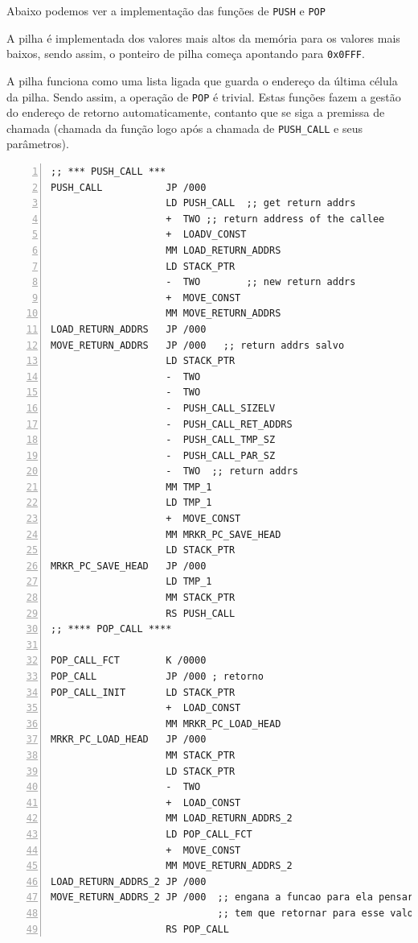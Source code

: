 Abaixo podemos ver a implementação das funções de \verb!PUSH! e \verb!POP!

A pilha é implementada dos valores mais altos da memória para os valores mais
baixos, sendo assim, o ponteiro de pilha começa apontando para \verb!0x0FFF!.

A pilha funciona como uma lista ligada que guarda o endereço da última célula
da pilha. Sendo assim, a operação de \verb!POP! é trivial. Estas funções fazem
a gestão do endereço de retorno automaticamente, contanto que se siga a
premissa de chamada (chamada da função logo após a chamada de \verb!PUSH_CALL!
e seus parâmetros).

\begin{lstlisting}[basicstyle=\footnotesize,numbers=left,breaklines=true,morekeywords={}]
;; *** PUSH_CALL ***
PUSH_CALL           JP /000 
                    LD PUSH_CALL  ;; get return addrs 
                    +  TWO ;; return address of the callee
                    +  LOADV_CONST
                    MM LOAD_RETURN_ADDRS 
                    LD STACK_PTR
                    -  TWO        ;; new return addrs  
                    +  MOVE_CONST 
                    MM MOVE_RETURN_ADDRS 
LOAD_RETURN_ADDRS   JP /000  
MOVE_RETURN_ADDRS   JP /000   ;; return addrs salvo 
                    LD STACK_PTR          
                    -  TWO 
                    -  TWO 
                    -  PUSH_CALL_SIZELV
                    -  PUSH_CALL_RET_ADDRS
                    -  PUSH_CALL_TMP_SZ
                    -  PUSH_CALL_PAR_SZ 
                    -  TWO  ;; return addrs
                    MM TMP_1
                    LD TMP_1 
                    +  MOVE_CONST 
                    MM MRKR_PC_SAVE_HEAD 
                    LD STACK_PTR 
MRKR_PC_SAVE_HEAD   JP /000 
                    LD TMP_1 
                    MM STACK_PTR
                    RS PUSH_CALL
;; **** POP_CALL ****

POP_CALL_FCT        K /0000             
POP_CALL            JP /000 ; retorno 
POP_CALL_INIT       LD STACK_PTR 
                    +  LOAD_CONST 
                    MM MRKR_PC_LOAD_HEAD 
MRKR_PC_LOAD_HEAD   JP /000 
                    MM STACK_PTR 
                    LD STACK_PTR 
                    -  TWO
                    +  LOAD_CONST 
                    MM LOAD_RETURN_ADDRS_2
                    LD POP_CALL_FCT 
                    +  MOVE_CONST 
                    MM MOVE_RETURN_ADDRS_2
LOAD_RETURN_ADDRS_2 JP /000 
MOVE_RETURN_ADDRS_2 JP /000  ;; engana a funcao para ela pensar que ela 
                             ;; tem que retornar para esse valor 
                    RS POP_CALL
\end{lstlisting}


